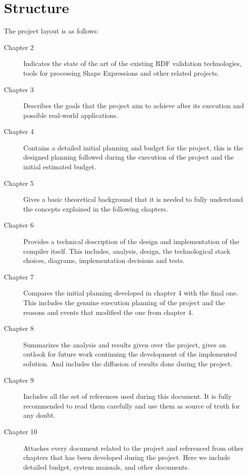\section{Structure}
The project layout is as follows:\\

\begin{description}
	\item[Chapter 2] Indicates the state of the art of the existing RDF validation technologies, tools for processing Shape Expressions and other related projects.
	\item[Chapter 3] Describes the goals that the project aim to achieve after its execution and possible real-world applications.
	\item[Chapter 4] Contains a detailed initial planning and budget for the project, this is the designed planning followed during the execution of the project and the initial estimated budget.
	\item[Chapter 5] Gives a basic theoretical background that it is needed to fully understand the concepts explained in the following chapters.
	\item[Chapter 6] Provides a technical description of the design and implementation of the compiler itself. This includes, analysis, design, the technological stack choices, diagrams, implementation decisions and tests.
	\item[Chapter 7] Compares the initial planning developed in chapter 4 with the final one. This includes the genuine execution planning of the project and the reasons and events that modified the one from chapter 4.
	\item[Chapter 8] Summarizes the analysis and results given over the project, gives an outlook for future work continuing the development of the implemented solution. And includes the diffusion of results done during the project.
	\item[Chapter 9] Includes all the set of references used during this document. It is fully recommended to read them carefully and use them as source of truth for any doubt.
	\item[Chapter 10] Attaches every document related to the project and referenced from other chapters that has been developed during the project. Here we include detailed budget, system manuals, and other documents.
\end{description}
